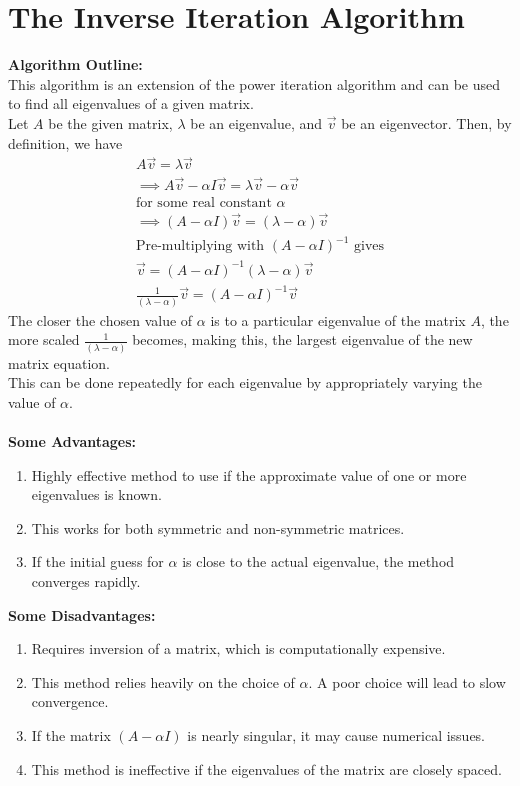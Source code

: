 \documentclass[journal,12pt,twocolumn]{IEEEtran}
\theoremstyle{remark}
\begin{document}
\section{The Inverse Iteration Algorithm}
\textbf{Algorithm Outline:}
\\
This algorithm is an extension of the power iteration algorithm and can be used to find all eigenvalues of a given matrix. \\
Let $A$ be the given matrix, $\lambda$ be an eigenvalue, and $\vec{v}$ be an eigenvector. Then, by definition, we have
\begin{align*}
A\vec{v} = \lambda\vec{v} \\
\implies A\vec{v} - \alpha I\vec{v} = \lambda\vec{v} - \alpha\vec{v} \\
\text{for some real constant } \alpha \\
\implies (A - \alpha I)\vec{v} = (\lambda - \alpha)\vec{v} \\
\text{Pre-multiplying with } (A - \alpha I)^{-1} \text{ gives} \\
\vec{v} = (A - \alpha I)^{-1} (\lambda - \alpha)\vec{v} \\
\frac{1}{(\lambda - \alpha)} \vec{v} = (A - \alpha I)^{-1} \vec{v}
\end{align*}
The closer the chosen value of $\alpha$ is to a particular eigenvalue of the matrix $A$, the more scaled $\frac{1}{(\lambda - \alpha)}$ becomes, making this, the largest eigenvalue of the new matrix equation. \\
This can be done repeatedly for each eigenvalue by appropriately varying the value of $\alpha$.
\\ \\
\textbf{Some Advantages:}
\begin{enumerate}
\item Highly effective method to use if the approximate value of one or more eigenvalues is known.
\item This works for both symmetric and non-symmetric matrices.
\item If the initial guess for $\alpha$ is close to the actual eigenvalue, the method converges rapidly.
\end{enumerate}
\textbf{Some Disadvantages:}
\begin{enumerate}
\item Requires inversion of a matrix, which is computationally expensive.
\item This method relies heavily on the choice of $\alpha$. A poor choice will lead to slow convergence. 
\item If the matrix $(A - \alpha I)$ is nearly singular, it may cause numerical issues.
\item This method is ineffective if the eigenvalues of the matrix are closely spaced. 
\end{enumerate}
\end{document}
